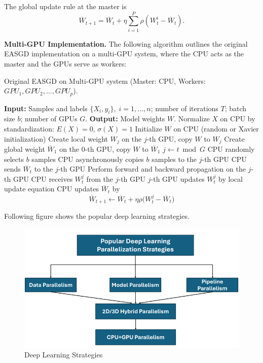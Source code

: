 \documentclass[12pt]{book}
\begin{document}
The global update rule at the master is
\[
\overline{W}_{t+1} = \overline{W}_t + \eta \sum_{i=1}^P \rho \left(W_t^i - \overline{W}_t\right).
\]

\textbf{Multi-GPU Implementation.}  
The following algorithm outlines the original EASGD implementation on a multi-GPU system, where the CPU acts as the master and the GPUs serve as workers:

\begin{algorithm}[H]
\caption{Original EASGD on Multi-GPU system (Master: CPU, Workers: $GPU_1, GPU_2, \ldots, GPU_p$).}
\label{alg:easgd}
\begin{algorithmic}[1]
\State \textbf{Input:} Samples and labels $\{X_i, y_i\}, \; i=1,\ldots,n$; number of iterations $T$; batch size $b$; number of GPUs $G$.
\State \textbf{Output:} Model weights $W$.
\State Normalize $X$ on CPU by standardization: $E(X)=0$, $\sigma(X)=1$
\State Initialize $W$ on CPU (random or Xavier initialization)
    \State Create local weight $W_j$ on the $j$-th GPU, copy $W$ to $W_j$
\EndFor
\State Create global weight $\overline{W}_1$ on the 0-th GPU, copy $W$ to $\overline{W}_1$
    \State $j \gets t \bmod G$
    \State CPU randomly selects $b$ samples
    \State CPU asynchronously copies $b$ samples to the $j$-th GPU
    \State CPU sends $\overline{W}_t$ to the $j$-th GPU
    \State Perform forward and backward propagation on the $j$-th GPU
    \State CPU receives $W_t^j$ from the $j$-th GPU
    \State $j$-th GPU updates $W_t^j$ by local update equation
    \State CPU updates $\overline{W}_t$ by
    \[
        \overline{W}_{t+1} \gets \overline{W}_t + \eta \rho \big(W_t^j - \overline{W}_t \big)
    \]
\EndFor
\end{algorithmic}
\end{algorithm}

Following figure shows the popular deep learning strategies.
\begin{figure}[ht]
    \centering
    \includegraphics[width=0.75\linewidth]{images/strags.png}
    \caption{Deep Learning Strategies}
\end{figure}
\end{document}
